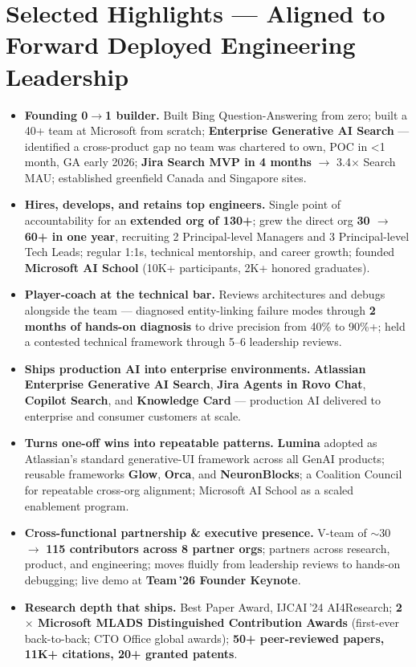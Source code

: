 \documentclass[10.5pt,letterpaper]{article}
\begin{document}
\section*{Selected Highlights --- Aligned to Forward Deployed Engineering Leadership}
\begin{itemize}
  \item \textbf{Founding 0$\to$1 builder.} Built Bing Question-Answering from zero; built a 40+ team at Microsoft from scratch; \textbf{Enterprise Generative AI Search} --- identified a cross-product gap no team was chartered to own, POC in <1 month, GA early 2026; \textbf{Jira Search MVP in 4 months} $\to$ 3.4$\times$ Search MAU; established greenfield Canada and Singapore sites.
  \item \textbf{Hires, develops, and retains top engineers.} Single point of accountability for an \textbf{extended org of 130+}; grew the direct org \textbf{30 $\to$ 60+ in one year}, recruiting 2 Principal-level Managers and 3 Principal-level Tech Leads; regular 1:1s, technical mentorship, and career growth; founded \textbf{Microsoft AI School} (10K+ participants, 2K+ honored graduates).
  \item \textbf{Player-coach at the technical bar.} Reviews architectures and debugs alongside the team --- diagnosed entity-linking failure modes through \textbf{2 months of hands-on diagnosis} to drive precision from 40\% to 90\%+; held a contested technical framework through 5--6 leadership reviews.
  \item \textbf{Ships production AI into enterprise environments.} \textbf{Atlassian Enterprise Generative AI Search}, \textbf{Jira Agents in Rovo Chat}, \textbf{Copilot Search}, and \textbf{Knowledge Card} --- production AI delivered to enterprise and consumer customers at scale.
  \item \textbf{Turns one-off wins into repeatable patterns.} \textbf{Lumina} adopted as Atlassian's standard generative-UI framework across all GenAI products; reusable frameworks \textbf{Glow}, \textbf{Orca}, and \textbf{NeuronBlocks}; a Coalition Council for repeatable cross-org alignment; Microsoft AI School as a scaled enablement program.
  \item \textbf{Cross-functional partnership \& executive presence.} V-team of $\sim$30 $\to$ \textbf{115 contributors across 8 partner orgs}; partners across research, product, and engineering; moves fluidly from leadership reviews to hands-on debugging; live demo at \textbf{Team\,'26 Founder Keynote}.
  \item \textbf{Research depth that ships.} Best Paper Award, IJCAI\,'24 AI4Research; \textbf{2$\times$ Microsoft MLADS Distinguished Contribution Awards} (first-ever back-to-back; CTO Office global awards); \textbf{50+ peer-reviewed papers, 11K+ citations, 20+ granted patents}.
\end{itemize}
\end{document}
